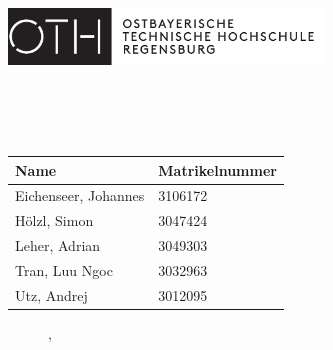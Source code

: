 \begin{titlepage}
	\includegraphics[height=1.5cm]{Logo/oth_logo_neu.eps}
	\vspace{1cm}
	\begin{center}       
        \spacedallcaps{\small{\myUni}} \\
        \spacedallcaps{\small{\myFaculty}} \\ \vspace*{2\baselineskip}
		\Large     
        \begingroup
        	\spacedallcaps{\textbf{\myTitle}} \\ \vspace*{2\baselineskip}
            \textbf{\mySubtitle}
        \endgroup
        \large
        \vspace*{10\baselineskip}
		\begin{table}[h]
			\centering
			\begin{tabularx}{0.5\textwidth}{|X|X|}
			\hline 
			\textbf{Name} & \textbf{Matrikelnummer} \\
			\hline 
			Eichenseer, Johannes & 3106172 \\ 
			\hline 
			Hölzl, Simon & 3047424 \\ 
			\hline 
			Leher, Adrian & 3049303 \\ 
			\hline 
			Tran, Luu Ngoc & 3032963 \\ 
			\hline 
			Utz, Andrej & 3012095 \\ 
			\hline
			\end{tabularx}
		\end{table}
    	\begin{figure}[b]
    		\begin{center}
		    	\myTime, \myLocation
	    	\end{center}
    	\end{figure}
    \end{center}
\end{titlepage}   